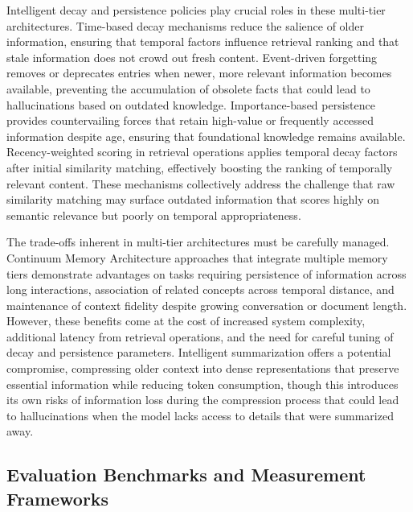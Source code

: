 \documentclass[11pt,letterpaper]{article}
\begin{document}
Intelligent decay and persistence policies play crucial roles in these multi-tier architectures. Time-based decay mechanisms reduce the salience of older information, ensuring that temporal factors influence retrieval ranking and that stale information does not crowd out fresh content. Event-driven forgetting removes or deprecates entries when newer, more relevant information becomes available, preventing the accumulation of obsolete facts that could lead to hallucinations based on outdated knowledge. Importance-based persistence provides countervailing forces that retain high-value or frequently accessed information despite age, ensuring that foundational knowledge remains available. Recency-weighted scoring in retrieval operations applies temporal decay factors after initial similarity matching, effectively boosting the ranking of temporally relevant content. These mechanisms collectively address the challenge that raw similarity matching may surface outdated information that scores highly on semantic relevance but poorly on temporal appropriateness.

The trade-offs inherent in multi-tier architectures must be carefully managed. Continuum Memory Architecture approaches that integrate multiple memory tiers demonstrate advantages on tasks requiring persistence of information across long interactions, association of related concepts across temporal distance, and maintenance of context fidelity despite growing conversation or document length. However, these benefits come at the cost of increased system complexity, additional latency from retrieval operations, and the need for careful tuning of decay and persistence parameters. Intelligent summarization offers a potential compromise, compressing older context into dense representations that preserve essential information while reducing token consumption, though this introduces its own risks of information loss during the compression process that could lead to hallucinations when the model lacks access to details that were summarized away.

\subsection{Evaluation Benchmarks and Measurement Frameworks}
\end{document}
